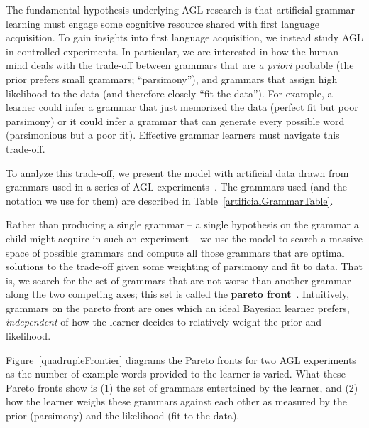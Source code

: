 \documentclass{article}
\begin{document}

The fundamental hypothesis underlying AGL research is that
artificial grammar learning must engage some cognitive resource shared with first language acquisition. To gain insights into first language acquisition, we 
instead study AGL in controlled experiments.
In particular, we are interested in how the human mind deals with the trade-off between
grammars that are \emph{a priori} probable (the prior prefers small grammars; ``parsimony''), and grammars that
assign high likelihood to the data (and therefore closely ``fit the data'').
For example, a learner could infer a grammar that just memorized the data (perfect fit but poor parsimony)
or it could infer a grammar that can generate every
possible word (parsimonious but a poor fit).
Effective grammar learners must navigate this trade-off.

To analyze this trade-off, we present the model with artificial data drawn from grammars used in a series of AGL experiments~\citep{gerken2010infants,Marcus1999,frank2011three}. The grammars used (and the notation we use for them) are described in Table~\ref{artificialGrammarTable}. 

Rather than producing a single grammar -- a single hypothesis on the grammar a child might acquire in such an experiment -- we use the model to search a massive space of possible grammars and compute all those grammars that are optimal solutions to the trade-off given some weighting of parsimony and fit to data. That is, we search for the set of grammars that
are not worse than another grammar along
the two competing axes; this set is called the \textbf{pareto front}~\citep{mattson2005pareto}.
Intuitively, grammars on the pareto front
are ones which an ideal Bayesian learner prefers,
\emph{independent} of how the learner decides to
relatively weight the prior and likelihood.

Figure~\ref{quadrupleFrontier}
diagrams the Pareto fronts for two AGL experiments
as the number of
example words provided to the learner is varied.
What these Pareto fronts show is (1)
the set of grammars entertained by the learner,
and (2) how the learner weighs these grammars against each other
as measured by the prior (parsimony) and the likelihood (fit to the data).
\end{document}
